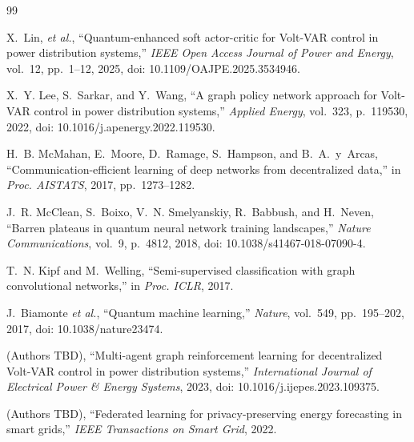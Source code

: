 \documentclass[journal]{IEEEtran}
\begin{document}
\begin{thebibliography}{99}

X.~Lin, \textit{et al.},
``Quantum-enhanced soft actor-critic for Volt-VAR control
in power distribution systems,''
\textit{IEEE Open Access Journal of Power and Energy},
vol.~12, pp.~1--12, 2025,
doi: 10.1109/OAJPE.2025.3534946.

X.~Y. Lee, S.~Sarkar, and Y.~Wang,
``A graph policy network approach for Volt-VAR control
in power distribution systems,''
\textit{Applied Energy}, vol.~323, p.~119530, 2022,
doi: 10.1016/j.apenergy.2022.119530.

H.~B. McMahan, E.~Moore, D.~Ramage, S.~Hampson, and B.~A.~y~Arcas,
``Communication-efficient learning of deep networks from
decentralized data,''
in \textit{Proc. AISTATS}, 2017, pp.~1273--1282.

J.~R. McClean, S.~Boixo, V.~N. Smelyanskiy, R.~Babbush, and H.~Neven,
``Barren plateaus in quantum neural network training landscapes,''
\textit{Nature Communications}, vol.~9, p.~4812, 2018,
doi: 10.1038/s41467-018-07090-4.

T.~N. Kipf and M.~Welling,
``Semi-supervised classification with graph convolutional networks,''
in \textit{Proc. ICLR}, 2017.

J.~Biamonte \textit{et al.},
``Quantum machine learning,''
\textit{Nature}, vol.~549, pp.~195--202, 2017,
doi: 10.1038/nature23474.

(Authors TBD),
``Multi-agent graph reinforcement learning for decentralized
Volt-VAR control in power distribution systems,''
\textit{International Journal of Electrical Power \& Energy Systems},
2023, doi: 10.1016/j.ijepes.2023.109375.

(Authors TBD),
``Federated learning for privacy-preserving energy forecasting
in smart grids,''
\textit{IEEE Transactions on Smart Grid}, 2022.

\end{thebibliography}
\end{document}
